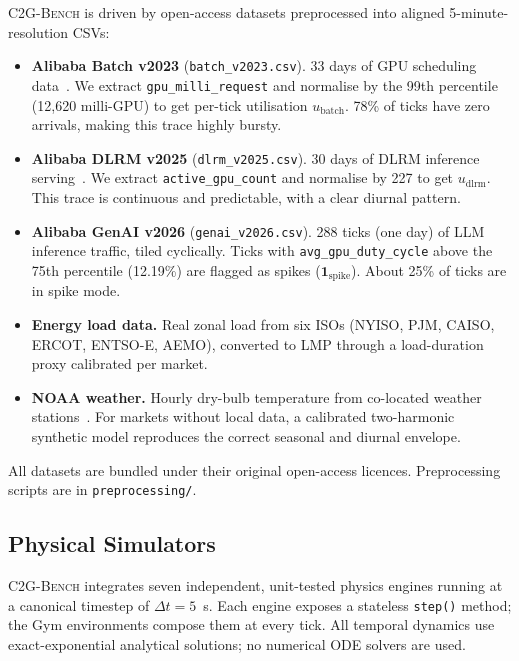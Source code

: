 \documentclass{article}
\newcommand{\cname}{\textsc{C2G-Bench}}
\begin{document}
\cname{} is driven by open-access datasets preprocessed into aligned
5-minute-resolution CSVs:

\begin{itemize}[leftmargin=*, itemsep=2pt]
  \item \textbf{Alibaba Batch v2023} (\texttt{batch\_v2023.csv}).
        33 days of GPU scheduling data~\citep{alibaba2023cluster}.
        We extract \texttt{gpu\_milli\_request} and normalise by the 99th
        percentile (12,620 milli-GPU) to get per-tick utilisation $u_{\text{batch}}$.
        78\% of ticks have zero arrivals, making this trace highly bursty.

  \item \textbf{Alibaba DLRM v2025} (\texttt{dlrm\_v2025.csv}).
        30 days of DLRM inference serving~\citep{alibaba2023cluster}.
        We extract \texttt{active\_gpu\_count} and normalise by 227 to
        get $u_{\text{dlrm}}$. This trace is continuous and predictable,
        with a clear diurnal pattern.

  \item \textbf{Alibaba GenAI v2026} (\texttt{genai\_v2026.csv}).
        288 ticks (one day) of LLM inference traffic, tiled cyclically.
        Ticks with \texttt{avg\_gpu\_duty\_cycle} above the 75th percentile
        (12.19\%) are flagged as spikes ($\mathbf{1}_{\text{spike}}$).
        About 25\% of ticks are in spike mode.

  \item \textbf{Energy load data.}
        Real zonal load from six ISOs (NYISO, PJM, CAISO, ERCOT, ENTSO-E, AEMO),
        converted to LMP through a load-duration proxy calibrated per market.

  \item \textbf{NOAA weather.}
        Hourly dry-bulb temperature from co-located weather
        stations~\citep{noaa2024isd}.
        For markets without local data, a calibrated two-harmonic synthetic
        model reproduces the correct seasonal and diurnal envelope.
\end{itemize}

All datasets are bundled under their original open-access licences.
Preprocessing scripts are in \texttt{preprocessing/}.

\subsection{Physical Simulators}
\label{sec:simulators}

\cname{} integrates seven independent, unit-tested physics engines running
at a canonical timestep of $\Delta t = 5$~s.
Each engine exposes a stateless \texttt{step()} method; the Gym environments
compose them at every tick.
All temporal dynamics use exact-exponential analytical solutions; no numerical
ODE solvers are used.
\end{document}
